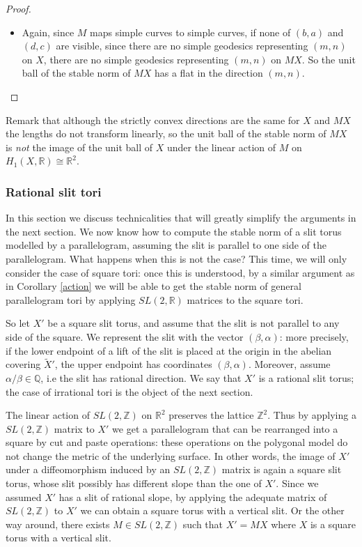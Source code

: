 \documentclass{article}
\newcommand{\QQ}{\mathbb{Q}}
\newcommand{\RR}{\mathbb{R}}
\newcommand{\ZZ}{\mathbb{Z}}
\theoremstyle{definition}
\begin{document}
\begin{proof}
\begin{itemize}
\item Again, since $M$ maps simple curves to simple curves, if none of $(b,a)$ and $(d,c)$ are visible, since there are no simple geodesics representing $(m,n)$ on $X$, there are no simple geodesics representing $(m,n)$ on $MX$. So the unit ball of the stable norm of $MX$ has a flat in the direction $(m,n)$.

\end{itemize}

\end{proof}


Remark that although the strictly convex directions are the same for $X$ and $MX$ the lengths do not transform linearly, so the unit ball of the stable norm of $MX$ is \emph{not} the image of the unit ball of $X$ under the linear action of $M$ on $H_1(X,\RR) \cong \RR^2 $. 

\subsubsection{Rational slit tori}

In this section we discuss technicalities that will greatly simplify the arguments in the next section.
We now know how to compute the stable norm of a slit torus modelled by a parallelogram, assuming the slit is parallel to one side of the parallelogram. What happens when this is not the case? This time, we will only consider the case of square tori: once this is understood, by a similar argument as in Corollary \ref{action} we will be able to get the stable norm of general parallelogram tori by applying $SL(2,\RR)$ matrices to the square tori. \newline  

So let $X'$ be a square slit torus, and assume that the slit is not parallel to any side of the square. We represent the slit with the vector $(\beta, \alpha)$: more precisely, if the lower endpoint of a lift of the slit is placed at the origin in the abelian covering $\tilde{X}'$, the upper endpoint has coordinates $(\beta,\alpha)$. Moreover, assume  $\alpha / \beta\in \QQ$, i.e the slit has rational direction. We say that $X'$ is a rational slit torus; the case of irrational tori is the object of the next section. \newline

The linear action of $SL(2,\ZZ)$ on $\RR^2$ preserves the lattice $\ZZ^2$. Thus by applying a $SL(2,\ZZ)$ matrix to $X'$ we get a parallelogram that can be rearranged into a square by cut and paste operations: these operations on the polygonal model do not change the metric of the underlying surface. In other words, the image of $X'$ under a diffeomorphism induced by an $SL(2,\ZZ)$ matrix is again a square slit torus, whose slit possibly has different slope than the one of $X'$. Since we assumed $X'$ has a slit of rational slope, by applying the adequate matrix of $SL(2,\ZZ)$ to $X'$ we can obtain a square torus with a vertical slit. Or the other way around, there exists $M\in SL(2,\ZZ)$ such that $X' = MX$ where $X$ is a square torus with a vertical slit.
\end{document}
